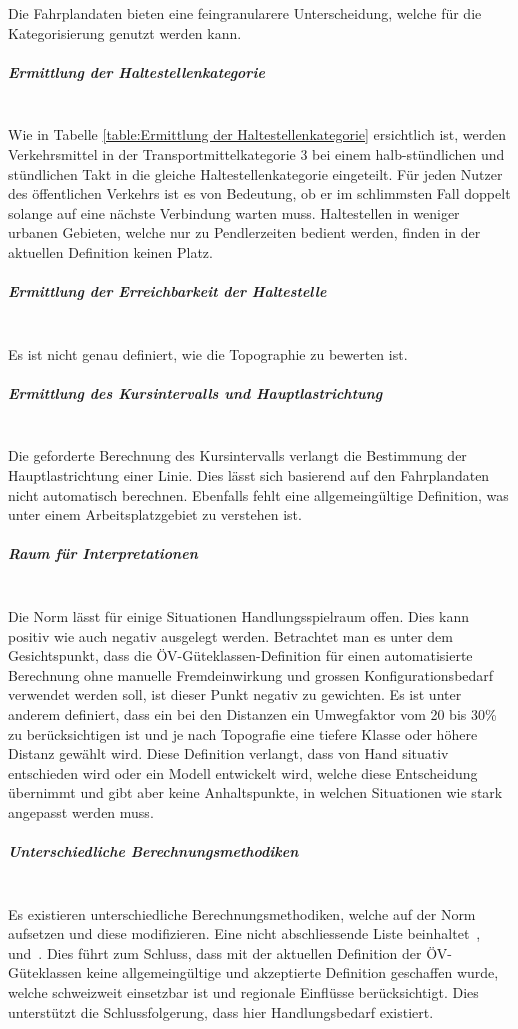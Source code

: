 Die Fahrplandaten bieten eine feingranularere Unterscheidung, welche für die Kategorisierung genutzt werden kann.

\subparagraph{Ermittlung der Haltestellenkategorie}~\\
Wie in Tabelle \ref{table:Ermittlung der Haltestellenkategorie} ersichtlich ist, werden Verkehrsmittel in der Transportmittelkategorie 3 bei einem halb-stündlichen und stündlichen Takt in die gleiche Haltestellenkategorie eingeteilt.
Für jeden Nutzer des öffentlichen Verkehrs ist es von Bedeutung, ob er im schlimmsten Fall doppelt solange auf eine nächste Verbindung warten muss.
Haltestellen in weniger urbanen Gebieten, welche nur zu Pendlerzeiten bedient werden, finden in der aktuellen Definition keinen Platz.

\subparagraph{Ermittlung der Erreichbarkeit der Haltestelle}~\\
Es ist nicht genau definiert, wie die Topographie zu bewerten ist.

\subparagraph{Ermittlung des Kursintervalls und Hauptlastrichtung}~\\
Die geforderte Berechnung des Kursintervalls verlangt die Bestimmung der Hauptlastrichtung einer Linie.
Dies lässt sich basierend auf den Fahrplandaten nicht automatisch berechnen.
Ebenfalls fehlt eine allgemeingültige Definition, was unter einem Arbeitsplatzgebiet zu verstehen ist.

\subparagraph{Raum für Interpretationen}~\\
Die Norm lässt für einige Situationen Handlungsspielraum offen.
Dies kann positiv wie auch negativ ausgelegt werden.
Betrachtet man es unter dem Gesichtspunkt, dass die \acs{ÖV}-Güteklassen-Definition für einen automatisierte Berechnung ohne manuelle Fremdeinwirkung und grossen Konfigurationsbedarf verwendet werden soll, ist dieser Punkt negativ zu gewichten.
Es ist unter anderem definiert, dass ein bei den Distanzen ein Umwegfaktor vom 20 bis 30\% zu berücksichtigen ist und je nach Topografie eine tiefere Klasse oder höhere Distanz gewählt wird.
Diese Definition verlangt, dass von Hand situativ entschieden wird oder ein Modell entwickelt wird, welche diese Entscheidung übernimmt und gibt aber keine Anhaltspunkte, in welchen Situationen wie stark angepasst werden muss.

\subparagraph{Unterschiedliche Berechnungsmethodiken}~\\
Es existieren unterschiedliche Berechnungsmethodiken, welche auf der Norm~\cite{sn640290} aufsetzen und diese modifizieren.
Eine nicht abschliessende Liste beinhaltet~\cite{berechnung_are},~\cite{oev-guteklasse-gr} und~\cite{oev-guteklassen-zh}.
Dies führt zum Schluss, dass mit der aktuellen Definition der \acs{ÖV}-Güteklassen keine allgemeingültige und akzeptierte Definition geschaffen wurde, welche schweizweit einsetzbar ist und regionale Einflüsse berücksichtigt.
Dies unterstützt die Schlussfolgerung, dass hier Handlungsbedarf existiert.

